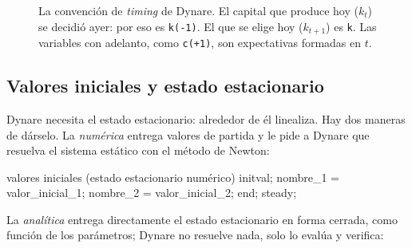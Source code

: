 \documentclass[11pt,a4paper]{report}
\newcommand{\code}[1]{\texttt{#1}}
\newcommand{\E}{\mathbb{E}}
\begin{document}
\begin{figure}[H]
\centering
{}
\caption{La convención de \emph{timing} de Dynare. El capital que produce hoy
($k_t$) se decidió ayer: por eso es \code{k(-1)}. El que se elige hoy
($k_{t+1}$) es \code{k}. Las variables con adelanto, como \code{c(+1)}, son
expectativas formadas en $t$.}
\label{fig:timing}
\end{figure}

\subsection{Valores iniciales y estado estacionario}
\label{sec:bloquess}

Dynare necesita el estado estacionario: alrededor de él linealiza. Hay dos maneras de
dárselo. La \emph{numérica} entrega valores de partida y le pide a Dynare que resuelva el
sistema estático con el método de Newton:

\begin{sintaxis}{valores iniciales (estado estacionario numérico)}
initval;
  nombre_1 = valor_inicial_1;
  nombre_2 = valor_inicial_2;
end;
steady;
\end{sintaxis}

\noindent La \emph{analítica} entrega directamente el estado estacionario en forma
cerrada, como función de los parámetros; Dynare no resuelve nada, solo lo evalúa y
verifica:
\end{document}
